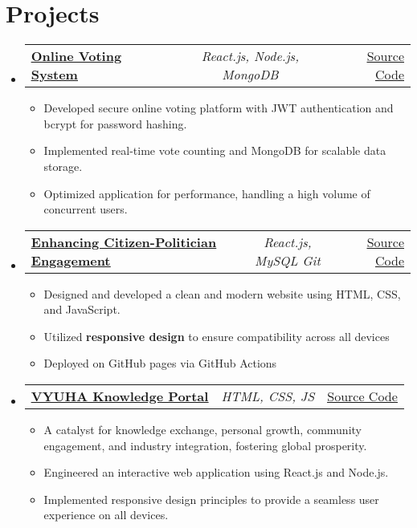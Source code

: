\documentclass[a4paper,11pt]{article}
\makeatletter
\newcommand{\resumeItem}[1]{
  \item\small{#1}
}
\newcommand{\resumeItemListStart}{\begin{itemize}[rightmargin=0.11in]}
\newcommand{\resumeItemListEnd}{\end{itemize}}
\newcommand{\resumeTrioHeading}[3]{
  \item\small{
    \begin{tabular*}{0.96\textwidth}[t]{
      l@{\extracolsep{\fill}}c@{\extracolsep{\fill}}r
    }
      \textbf{#1} & \textit{#2} & #3
    \end{tabular*}
  }
}
\newcommand{\resumeHeadingListStart}{
  \begin{itemize}[leftmargin=0.15in, label={}]
}
\newcommand{\resumeHeadingListEnd}{\end{itemize}}
\makeatother
\begin{document}
\section{Projects}
  \resumeHeadingListStart{}
      \resumeTrioHeading{\href{https://github.com/siva12170/online_voting_system}{\uline{Online Voting System}}}{React.js,  Node.js, MongoDB}{\href{https://github.com/siva12170/online_voting_system}{\uline{Source Code}}}
      \resumeItemListStart{}
        \resumeItem{Developed secure online voting platform with JWT authentication and bcrypt for password hashing.}
        \resumeItem{Implemented real-time vote counting and MongoDB for scalable data storage.}
        \resumeItem{Optimized application for performance, handling a high volume of concurrent users.}
      \resumeItemListEnd{}
    \resumeTrioHeading{\href{https://github.com/siva12170/PMK-WEBSITE-TDP-.git}{\uline{Enhancing Citizen-Politician Engagement}}}{React.js, MySQL Git}{\href{https://github.com/siva12170/PMK-WEBSITE-TDP-.git}{\uline{Source Code}}}
      \resumeItemListStart{}
        \resumeItem{Designed and developed a clean and modern website using HTML, CSS, and JavaScript.}
        \resumeItem{Utilized \textbf{responsive design} to ensure compatibility across all devices}
        \resumeItem{Deployed on GitHub pages via GitHub Actions}
      \resumeItemListEnd{}

      \resumeTrioHeading{\href{https://github.com/siva12170/vyuha_main}{\uline{VYUHA Knowledge Portal}}}{HTML, CSS, JS}{\href{https://github.com/siva12170/vyuha_main}{\uline{Source Code}}}
      \resumeItemListStart{}
        \resumeItem{A catalyst for knowledge exchange, personal growth, community engagement, and industry integration, fostering global prosperity.}
        \resumeItem{Engineered an interactive web application using React.js and Node.js.}
        \resumeItem{Implemented responsive design principles to provide a seamless user experience on all devices.}
      \resumeItemListEnd{}
  \resumeHeadingListEnd{}


\end{document}
